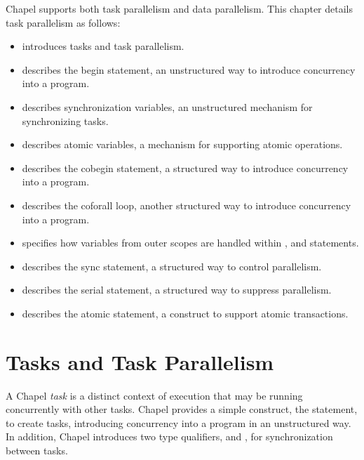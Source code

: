 \label{Task_Parallelism_and_Synchronization}

Chapel supports both task parallelism and data parallelism.  This
chapter details task parallelism as follows:
\begin{itemize}
\item {} introduces tasks and task parallelism.
\item {} describes the begin statement, an unstructured way
to introduce concurrency into a program.
\item {} describes synchronization
variables, an unstructured mechanism for synchronizing tasks.
\item {} describes atomic variables, a mechanism
for supporting atomic operations.
\item {} describes the cobegin statement, a structured way to
introduce concurrency into a program.
\item {} describes the coforall loop, another structured way to
introduce concurrency into a program.
\item {} specifies how variables from outer scopes
are handled within ,  and 
statements.
\item {} describes the sync statement, a structured
way to control parallelism.
\item {} describes the serial statement, a structured way to suppress
parallelism.
\item {} describes the atomic statement, a construct to
support atomic transactions.
\end{itemize}

\section{Tasks and Task Parallelism}
\label{Task_parallelism}

A Chapel \emph{task} is a distinct context of execution that may be
running concurrently with other tasks.  Chapel provides a simple
construct, the  statement, to create tasks, introducing
concurrency into a program in an unstructured way.  In addition,
Chapel introduces two type qualifiers,  and ,
for synchronization between tasks.


